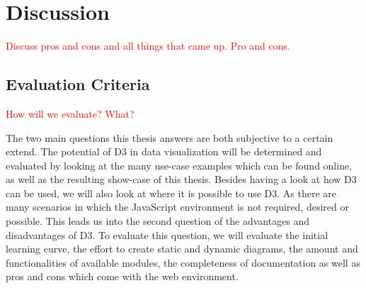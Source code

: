 \chapter{Discussion}
\textcolor{red}{
Discuss pros and cons and all things that came up. Pro and cons. }


\section{Evaluation Criteria}
\textcolor{red}{
How will we evaluate? What?}

The two main questions this thesis answers are both subjective to a certain extend. The potential of D3 in data visualization will be determined and evaluated by looking at the many use-case examples which can be found online, as well as the resulting show-case of this thesis. Besides having a look at how D3 can be used, we will also look at where it is possible to use D3. As there are many scenarios in which the JavaScript environment is not required, desired or possible. This leads us into the second question of the advantages and disadvantages of D3. To evaluate this question, we will evaluate the initial learning curve, the effort to create static and dynamic diagrams, the amount and functionalities of available modules, the completeness of documentation as well as pros and cons which come with the web environment.
